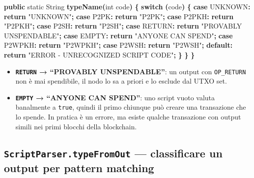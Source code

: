 \documentclass[
  italian,
  openany]{book}
\newenvironment{Shaded}{\begin{snugshade}}{\end{snugshade}}
\newcommand{\BuiltInTok}[1]{#1}
\newcommand{\ControlFlowTok}[1]{\textcolor[rgb]{0.13,0.29,0.53}{\textbf{#1}}}
\newcommand{\DataTypeTok}[1]{\textcolor[rgb]{0.13,0.29,0.53}{#1}}
\newcommand{\FunctionTok}[1]{\textcolor[rgb]{0.13,0.29,0.53}{\textbf{#1}}}
\newcommand{\KeywordTok}[1]{\textcolor[rgb]{0.13,0.29,0.53}{\textbf{#1}}}
\newcommand{\NormalTok}[1]{#1}
\newcommand{\OperatorTok}[1]{\textcolor[rgb]{0.81,0.36,0.00}{\textbf{#1}}}
\newcommand{\StringTok}[1]{\textcolor[rgb]{0.31,0.60,0.02}{#1}}
\providecommand{\tightlist}{%
  \setlength{\itemsep}{0pt}\setlength{\parskip}{0pt}}
\begin{document}
\begin{Shaded}
\begin{Highlighting}[]
    \KeywordTok{public} \DataTypeTok{static} \BuiltInTok{String} \FunctionTok{typeName}\OperatorTok{(}\DataTypeTok{int}\NormalTok{ code}\OperatorTok{)} \OperatorTok{\{}
        \ControlFlowTok{switch} \OperatorTok{(}\NormalTok{code}\OperatorTok{)} \OperatorTok{\{}
            \ControlFlowTok{case} \BuiltInTok{UNKNOWN}\OperatorTok{:} \ControlFlowTok{return} \StringTok{"UNKNOWN"}\OperatorTok{;}
            \ControlFlowTok{case}\NormalTok{ P2PK}\OperatorTok{:}    \ControlFlowTok{return} \StringTok{"P2PK"}\OperatorTok{;}
            \ControlFlowTok{case}\NormalTok{ P2PKH}\OperatorTok{:}   \ControlFlowTok{return} \StringTok{"P2PKH"}\OperatorTok{;}
            \ControlFlowTok{case}\NormalTok{ P2SH}\OperatorTok{:}    \ControlFlowTok{return} \StringTok{"P2SH"}\OperatorTok{;}
            \ControlFlowTok{case}\NormalTok{ RETURN}\OperatorTok{:}  \ControlFlowTok{return} \StringTok{"PROVABLY UNSPENDABLE"}\OperatorTok{;}
            \ControlFlowTok{case}\NormalTok{ EMPTY}\OperatorTok{:}   \ControlFlowTok{return} \StringTok{"ANYONE CAN SPEND"}\OperatorTok{;}
            \ControlFlowTok{case}\NormalTok{ P2WPKH}\OperatorTok{:}  \ControlFlowTok{return} \StringTok{"P2WPKH"}\OperatorTok{;}
            \ControlFlowTok{case}\NormalTok{ P2WSH}\OperatorTok{:}   \ControlFlowTok{return} \StringTok{"P2WSH"}\OperatorTok{;}
            \KeywordTok{default}\OperatorTok{:}      \ControlFlowTok{return} \StringTok{"ERROR {-} UNRECOGNIZED SCRIPT CODE"}\OperatorTok{;}
        \OperatorTok{\}}
    \OperatorTok{\}}
\OperatorTok{\}}
\end{Highlighting}
\end{Shaded}

\begin{itemize}
\tightlist
\item
  \textbf{\texttt{RETURN} → ``PROVABLY UNSPENDABLE''}: un output con
  \texttt{OP\_RETURN} non è mai spendibile, il nodo lo sa a priori e lo
  esclude dal UTXO set.
\item
  \textbf{\texttt{EMPTY} → ``ANYONE CAN SPEND''}: uno script vuoto
  valuta banalmente a \texttt{true}, quindi il primo chiunque può creare
  una transazione che lo spende. In pratica è un errore, ma esiste
  qualche transazione con output simili nei primi blocchi della
  blockchain.
\end{itemize}

\subsection{\texorpdfstring{\texttt{ScriptParser.typeFromOut} ---
classificare un output per pattern
matching}{ScriptParser.typeFromOut --- classificare un output per pattern matching}}\label{scriptparser.typefromout-classificare-un-output-per-pattern-matching}
\end{document}
